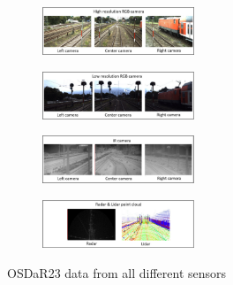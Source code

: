 \begin{figure}[H]
    \centering
    \begin{subfigure}{\textwidth}
        \centering
        \includegraphics[width=0.5\textwidth]{PICs/datasets/OSDaR23_dataset/camerasetup_high_res_cameras.png}
    \end{subfigure}

    \begin{subfigure}{\textwidth}
        \centering
        \includegraphics[width=0.5\textwidth]{PICs/datasets/OSDaR23_dataset/camerasetup_low_res_cameras.png}
    \end{subfigure}

    \begin{subfigure}{\textwidth}
        \centering
        \includegraphics[width=0.5\textwidth]{PICs/datasets/OSDaR23_dataset/camerasetup_IR.png}
    \end{subfigure}

    \begin{subfigure}{\textwidth}
        \centering
        \includegraphics[width=0.5\textwidth]{PICs/datasets/OSDaR23_dataset/camerasetup_Lidar_Radar.png}
    \end{subfigure}
    
    \caption{OSDaR23 data from all different sensors \cite{oSDaR23}}
    \label{fig:OSDaR23_captured_data}
\end{figure}

